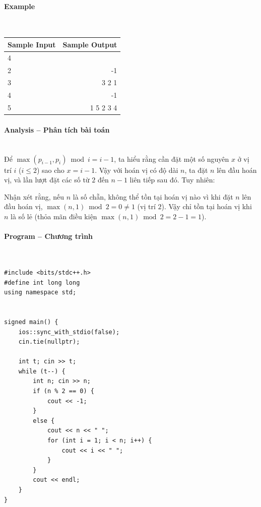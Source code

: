 \documentclass{article}
\begin{document}
\paragraph{Example}\mbox{} \\

\begin{table}[h]
    \centering
    \begin{tabular}{|l|r|}
        \hline
        \rowcolor{gray!30}
        \textbf{Sample Input} & \textbf{Sample Output} \\
        \hline
        4 & \\
        2 & -1 \\
        3 & 3 2 1 \\
        4 & -1 \\
        5 & 1 5 2 3 4 \\
        \hline
    \end{tabular}
\end{table}


\paragraph{Analysis -- Phân tích bài toán} \mbox{} \\

Để $\max(p_{i-1}, p_i) \bmod i = i - 1$, ta hiểu rằng cần đặt một số nguyên $x$ ở vị trí $i$ ($i \leq 2$) sao cho $x = i - 1$. Vậy với hoán vị có độ dài $n$, ta đặt $n$ lên đầu hoán vị, và lần lượt đặt các số từ $2$ đến $n - 1$ liên tiếp sau đó. Tuy nhiên:

Nhận xét rằng, nếu $n$ là số chẵn, không thể tồn tại hoán vị nào vì khi đặt $n$ lên đầu hoán vị, $\max(n, 1) \bmod 2 = 0 \ne 1$ (vị trí $2$). Vậy chỉ tồn tại hoán vị khi $n$ là số lẻ (thỏa mãn điều kiện $\max(n, 1) \bmod 2 = 2 - 1 = 1$).

\paragraph{Program -- Chương trình} \mbox{} \\

\begin{lstlisting}
#include <bits/stdc++.h>
#define int long long
using namespace std;


signed main() {
	ios::sync_with_stdio(false);
	cin.tie(nullptr);

	int t; cin >> t;
	while (t--) {
		int n; cin >> n;
		if (n % 2 == 0) {
			cout << -1;
		}
		else {
			cout << n << " ";
			for (int i = 1; i < n; i++) {
				cout << i << " ";
			}
		}
		cout << endl;
	}
}
	
\end{lstlisting}
\end{document}
